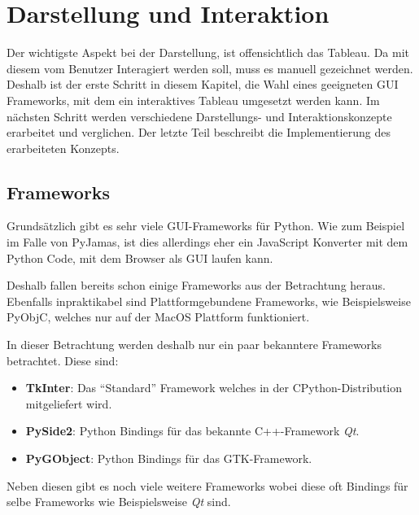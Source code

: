 
\chapter{Darstellung und Interaktion}
Der wichtigste Aspekt bei der Darstellung, ist offensichtlich das Tableau. Da mit diesem vom Benutzer Interagiert werden soll, muss es manuell gezeichnet werden. Deshalb ist der erste Schritt in diesem Kapitel, die Wahl eines geeigneten \ac{GUI} Frameworks, mit dem ein interaktives Tableau umgesetzt werden kann. Im nächsten Schritt werden verschiedene Darstellungs- und Interaktionskonzepte erarbeitet und verglichen. Der letzte Teil beschreibt die Implementierung des erarbeiteten Konzepts.

\section{Frameworks}
Grundsätzlich gibt es sehr viele \ac{GUI}-Frameworks für Python. Wie zum Beispiel im Falle von PyJamas, ist dies allerdings eher ein JavaScript Konverter mit dem Python Code, mit dem Browser als \ac{GUI} laufen kann.

Deshalb fallen bereits schon einige Frameworks aus der Betrachtung heraus. Ebenfalls inpraktikabel sind Plattformgebundene Frameworks, wie Beispielsweise PyObjC, welches nur auf der MacOS Plattform funktioniert.

In dieser Betrachtung werden deshalb nur ein paar bekanntere Frameworks betrachtet. Diese sind:
\begin{itemize}
\item \textbf{TkInter}: Das ``Standard'' Framework welches in der CPython-Distribution mitgeliefert wird.

\item \textbf{PySide2}: Python Bindings für das bekannte C++-Framework \textit{Qt}.

\item \textbf{PyGObject}: Python Bindings für das GTK-Framework.
\end{itemize}
Neben diesen gibt es noch viele weitere Frameworks wobei diese oft Bindings für selbe Frameworks wie Beispielsweise \textit{Qt} sind.

